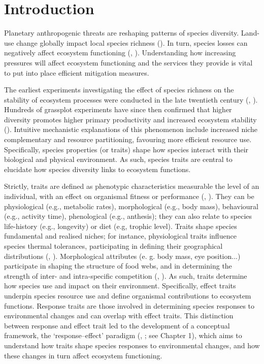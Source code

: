 \section{Introduction}
Planetary anthropogenic threats are reshaping patterns of species diversity. Land-use change globally impact local species richness (\cite{Newbold2015}). In turn, species losses can negatively affect ecosystem functioning (\cite{Hooper2005}, \cite{Hooper2012}). Understanding how increasing pressures will affect ecosystem functioning and the services they provide is vital to put into place efficient mitigation measures.
   
The earliest experiments investigating the effect of species richness on the stability of ecosystem processes were conducted in the late twentieth century (\cite{Tilman1994}, \cite{Naeem1994}). Hundreds of grassplot experiments have since then confirmed that higher diversity promotes higher primary productivity and increased ecosystem stability (\cite{Tilman2014}). Intuitive mechanistic explanations of this phenomenon include increased niche complementary and resource partitioning, favouring more efficient resource use. Specifically, species properties (or traits) shape how species interact with their biological and physical environment. As such, species traits are central to elucidate how species diversity links to ecosystem functions. 

Strictly, traits are defined as phenotypic characteristics measurable the level of an individual, with an effect on organismal fitness or performance (\cite{McGill2006}, \cite{Violle2007}). They can be physiological (e.g., metabolic rates), morphological (e.g., body mass), behavioural (e.g., activity time), phenological (e.g., anthesis); they can also relate to species life-history (e.g., longevity) or diet (e.g, trophic level).
Traits shape species fundamental and realised niches; for instance, physiological traits influence species thermal tolerances, participating in defining their geographical distributions (\cite{Calosi2010}, \cite{Khaliq2017}). Morphological attributes (e. g. body mass, eye position...) participate in shaping the structure of food webs, and in determining the strength of inter- and intra-specific competition (\cite{Gravel2016}, \cite{Laigle2018}). As such, traits determine how species use and impact on their environment. Specifically, effect traits underpin species resource use and define organismal contributions to ecosystem functions. Response traits are those involved in determining species responses to environmental changes and can overlap with effect traits. This distinction between response and effect trait led to the development of a conceptual framework, the `response--effect' paradigm (\cite{Lavorel2002}, \cite{Luck2012}; see Chapter 1), which aims to understand how traits shape species responses to environmental changes, and how these changes in turn affect ecosystem functioning. 

